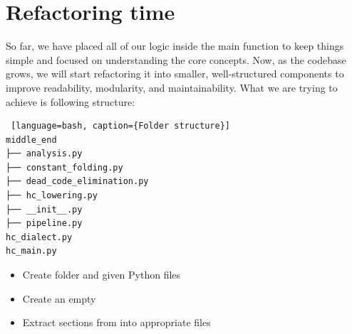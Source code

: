 \documentclass[../main.tex]{subfiles}
\begin{document}
\section{Refactoring time}
So far, we have placed all of our logic inside the main function to keep things simple
and focused on understanding the core concepts. Now, as the codebase grows, we will start
refactoring it into smaller, well-structured components to improve readability, modularity,
and maintainability.
What we are trying to achieve is following structure: 
\begin{lstlisting} [language=bash, caption={Folder structure}]
middle_end
├── analysis.py
├── constant_folding.py
├── dead_code_elimination.py
├── hc_lowering.py
├── __init__.py
├── pipeline.py
hc_dialect.py
hc_main.py
\end{lstlisting}

\begin{itemize}
    \item Create  folder and given Python files
    \item Create an empty 
    \item Extract sections from  into appropriate files
\end{itemize}
\end{document}

